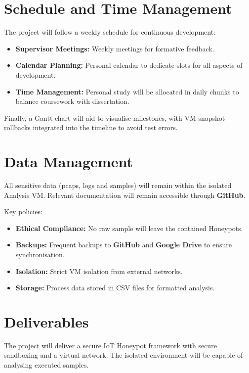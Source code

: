 \documentclass[a4paper,12pt,oneside]{book}			%
\begin{document}
\section{Schedule and Time Management}\label{sec:time management}
The project will follow a weekly schedule for continuous development:
\begin{itemize}
\item\textbf{Supervisor Meetings:} Weekly meetings for formative feedback.
\item\textbf{Calendar Planning:} Personal calendar to dedicate slots for all aspects of development.
\item\textbf{Time Management:} Personal study will be allocated in daily chunks to balance coursework with dissertation.
\end{itemize}
Finally, a Gantt chart will aid to visualise milestones, with VM snapshot rollbacks integrated into the timeline to avoid test errors. 



\section{Data Management}\label{sec:data management}

All sensitive data (pcaps, logs and samples) will remain within the isolated Analysis VM. Relevant documentation will remain accessible through \textbf{GitHub}. 

Key policies:
\begin{itemize}
	\item\textbf{Ethical Compliance:} No raw sample will leave the contained Honeypots.
	\item\textbf{Backups:} Frequent backups to \textbf{GitHub} and \textbf{Google Drive} to ensure synchronisation. 
	\item\textbf{Isolation:} Strict VM isolation from external networks.
	\item\textbf{Storage:} Process data stored in CSV files for formatted analysis.
\end{itemize}



\section{Deliverables}\label{sec: deliverables}

The project will deliver a secure IoT Honeypot framework with secure sandboxing and a virtual network. The isolated environment will be capable of analysing executed samples.
\end{document}
